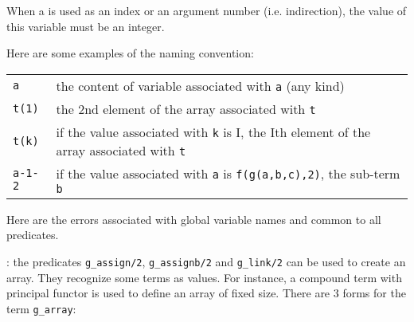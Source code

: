 When a  is used as an index or an argument number
(i.e. indirection), the value of this variable must be an integer.

Here are some examples of the naming convention:

\begin{tabular}{ll}
\texttt{a} & the content of variable associated with \texttt{a} (any kind) \\
\texttt{t(1)} & the 2nd element of the array associated with \texttt{t} \\
\texttt{t(k)} & if the value associated with \texttt{k} is I, the Ith element of the array associated with \texttt{t} \\
\texttt{a-1-2} & if the value associated with \texttt{a} is \texttt{f(g(a,b,c),2)}, the sub-term \texttt{b} \\
\end{tabular}

Here are the errors associated with global variable names and common to all
predicates.

\begin{PlErrorsNoTitle}






\end{PlErrorsNoTitle}

: the predicates \texttt{g\_assign/2}, \texttt{g\_assignb/2}
and \texttt{g\_link/2}  can be used to create an
array. They recognize some terms as values. For instance, a compound term
with principal functor  is used to define an array of fixed
size.  There are 3 forms for the term \texttt{g\_array}:

